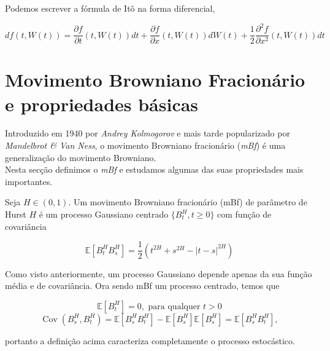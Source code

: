 \documentclass{article}
\begin{document}
\vspace{0.2cm}

Podemos escrever a fórmula de Itô na forma diferencial,

$$\boxed{df(t,W(t))=\frac{\partial f}{\partial t}(t,W(t))dt+\frac{\partial f}{\partial x}(t,W(t))dW(t)+\frac{1}{2}\frac{\partial^2 f}{\partial x^2}(t,W(t))dt}$$

\newpage


\section{Movimento Browniano Fracionário e propriedades básicas}

Introduzido em 1940 por \textit{Andrey Kolmogorov} e mais tarde popularizado por \textit{Mandelbrot \& Van Ness}, o movimento Browniano fracionário (\textit{mBf}) é uma generalização do movimento Browniano. \\



\noindent Nesta secção definimos o \textit{mBf} e estudamos algumas das suas propriedades mais importantes.

\vspace{0.5cm}

\begin{dfn}
Seja $H \in(0,1)$. Um movimento Browniano fracionário (mBf) de parâmetro de Hurst $H$ é um processo Gaussiano centrado $\{B_t^H, t\geq0\}$ com função de covariância 

\begin{equation*}
    \mathbb{E}[B_t^HB_s^H]=\frac{1}{2}(t^{2H}+s^{2H}-|t-s|^{2H})
\end{equation*}

\end{dfn}

Como visto anteriormente, um processo Gaussiano depende apenas da sua função média e de covariância. Ora sendo mBf um processo centrado, temos que 

\begin{equation*}
    \mathbb{E}[B_t^H]=0, \text{ para qualquer } t>0
\end{equation*}
\begin{equation*}
    \operatorname{Cov}(B_s^H,B_t^H)=\mathbb{E}[B_s^HB_t^H]-\mathbb{E}[B_s^H]\mathbb{E}[B_s^H]=\mathbb{E}[B_s^HB_t^H],
\end{equation*}

portanto a definição acima caracteriza completamente o processo estocástico.
\end{document}
